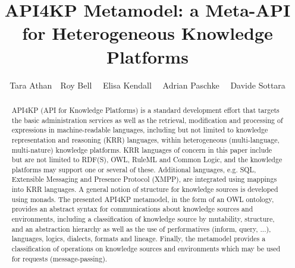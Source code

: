 \documentclass[runningheads]{llncs}
\title{API4KP Metamodel: a Meta-API for Heterogeneous Knowledge Platforms}
\date{}
\begin{document}
%
\author{Tara Athan\ \ Roy Bell \ \ Elisa Kendall \ \ Adrian Paschke \ \ Davide Sottara}

%
\maketitle

\begin{abstract}
API4KP (API for Knowledge Platforms) is a standard development effort that targets the basic administration services as well as the retrieval, modification and processing of expressions in machine-readable languages, including but not limited to knowledge representation and reasoning (KRR) languages, within heterogeneous (multi-language, multi-nature) knowledge platforms. KRR languages of concern in this paper include but are not limited to RDF(S), OWL, RuleML and Common Logic, and the knowledge platforms may support one or several of these. Additional languages, e.g. SQL, Extensible Messaging and Presence Protocol (XMPP), are integrated using mappings into KRR languages. A general notion of structure for knowledge sources is developed using monads. The presented API4KP metamodel, in the form of an OWL ontology, provides an abstract syntax for communications about knowledge sources and environments, including a classification of knowledge source by mutability, structure, and an abstraction hierarchy as well as the use of performatives (inform, query, ...), languages, logics, dialects, formats and lineage. Finally, the metamodel provides a classification of operations on knowledge sources and environments which may be used for requests (message-passing).
\end{abstract}

%
\end{document}

